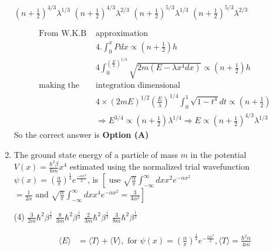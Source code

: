 \begin{enumerate}
\begin{tasks}
\task[\textbf{A.}] $\left(n+\frac{1}{2}\right)^{4 / 3} \lambda^{1 / 3}$
\task[\textbf{B.}] $\left(n+\frac{1}{2}\right)^{4 / 3} \lambda^{2 / 3}$
\task[\textbf{C.}] $\left(n+\frac{1}{2}\right)^{5 / 3} \lambda^{1 / 3}$
\task[\textbf{D.}] $\left(n+\frac{1}{2}\right)^{5 / 3} \lambda^{2 / 3}$
\end{tasks}
\begin{answer}
	$$
\begin{aligned}
\text{From W.K.B }&\text{approximation}\\
&4. \int_{0}^{x} P d x \propto\left(n+\frac{1}{2}\right) h\\
&4 \int_{0}^{\left(\frac{E}{\lambda}\right)^{1 / 4}} \sqrt{2 m\left(E-\lambda x^{4} d x\right)} \propto\left(n+\frac{1}{2}\right) h\\
\text{making the }&\text{integration dimensional}\\
&4 \times(2 m E)^{1 / 2}\left(\frac{E}{\lambda}\right)^{1 / 4} \int_{0}^{1} \sqrt{1-t^{4}} d t \propto\left(n+\frac{1}{2}\right) \\&\Rightarrow E^{3 / 4} \propto\left(n+\frac{1}{2}\right) \lambda^{1 / 4} \Rightarrow E \propto\left(n+\frac{1}{2}\right)^{4 / 3} \lambda^{1 / 3}
\end{aligned}
$$
So the correct answer is \textbf{Option (A)}
\end{answer}
\item The ground state energy of a particle of mass $m$ in the potential $V(x)=\frac{\hbar^{2} \beta}{6 m} x^{4}$ estimated using the normalized trial wavefunction $\psi(x)=\left(\frac{\alpha}{\pi}\right)^{\frac{1}{4}} e^{\frac{-\alpha x^{2}}{2}}$, is
$ \left[ \text { use } \sqrt{\frac{\alpha}{\pi}} \int_{-\infty}^{\infty} d x x^{2} e^{-\alpha x^{2}}\right. $\\
$\left. =\frac{1}{2 \alpha} \text { and } \sqrt{\frac{\alpha}{\pi}} \int_{-\infty}^{\infty} d x x^{4} e^{-\alpha x^{2}}=\frac{3}{4 \alpha^{2}}\right] $
{}
\begin{tasks}(4)
\task[\textbf{A.}] $\frac{3}{2 m} \hbar^{2} \beta^{\frac{1}{3}}$
\task[\textbf{B.}] $\frac{8}{3 m} \hbar^{2} \beta^{\frac{1}{3}}$
\task[\textbf{C.}] $\frac{2}{3 m} \hbar^{2} \beta^{\frac{1}{3}}$
\task[\textbf{D.}] $\frac{3}{8 m} \hbar^{2} \beta^{\frac{1}{3}}$
\end{tasks}
\begin{answer}
	$$
\begin{aligned}
\langle E\rangle&=\langle T\rangle+\langle V\rangle,\text{ for } \psi(x)=\left(\frac{\alpha}{\pi}\right)^{\frac{1}{4}} e^{-\frac{\alpha x^{2}}{2}},\langle T\rangle=\frac{\hbar^{2} \alpha}{4 m}\\

\end{aligned}$$
\end{answer}
\end{enumerate}
